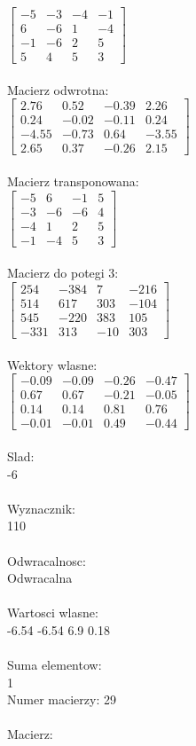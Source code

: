 \documentclass[a4paper,12pt]{article}
\begin{document}
$\begin{bmatrix} -5&-3&-4&-1\\6&-6&1&-4\\-1&-6&2&5\\5&4&5&3 \end{bmatrix}$
\\
\\
Macierz odwrotna:\\

$\begin{bmatrix} 2.76&0.52&-0.39&2.26\\0.24&-0.02&-0.11&0.24\\-4.55&-0.73&0.64&-3.55\\2.65&0.37&-0.26&2.15 \end{bmatrix}$
\\
\\
Macierz transponowana:\\

$\begin{bmatrix} -5&6&-1&5\\-3&-6&-6&4\\-4&1&2&5\\-1&-4&5&3 \end{bmatrix}$
\\
\\
Macierz do potegi 3:\\

$\begin{bmatrix} 254&-384&7&-216\\514&617&303&-104\\545&-220&383&105\\-331&313&-10&303 \end{bmatrix}$
\\
\\
Wektory wlasne:\\

$\begin{bmatrix} -0.09&-0.09&-0.26&-0.47\\0.67&0.67&-0.21&-0.05\\0.14&0.14&0.81&0.76\\-0.01&-0.01&0.49&-0.44 \end{bmatrix}$
\\
\\
Slad:\\
-6
\\
\\
Wyznacznik:\\
110
\\
\\
Odwracalnosc:\\
Odwracalna
\\
\\
Wartosci wlasne:\\
-6.54 -6.54 6.9 0.18
\\
\\
Suma elementow:\\
1
\\
\newpage
Numer macierzy:
29
\\
\\
Macierz:\\
\end{document}
